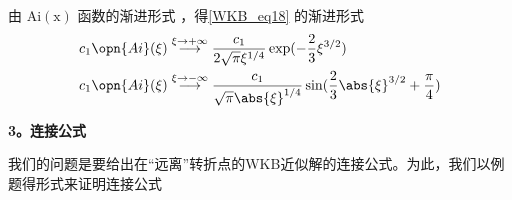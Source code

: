 由 $\mathrm{Ai(x)}$ 函数的渐进形式 ，得\autoref{WKB_eq18} 的渐进形式
\begin{equation}\label{WKB_eq22}
\begin{aligned}
&c_1\opn{Ai}(\xi) \overset{\xi \to +\infty}{\longrightarrow} \frac{c_1}{2\sqrt{\pi} \xi^{1/4}} \exp(-\frac{2}{3}\xi^{3/2})\\
&c_1\opn{Ai}(\xi) \overset{\xi \to -\infty}{\longrightarrow} \frac{c_1}{\sqrt{\pi} \abs{\xi}^{1/4}} \sin(\frac{2}{3}\abs{\xi}^{3/2}+\frac{\pi}{4})\\
\end{aligned}
\end{equation}

\textbf{3。连接公式}

我们的问题是要给出在“远离”转折点的WKB近似解的连接公式。为此，我们以例题得形式来证明连接公式
